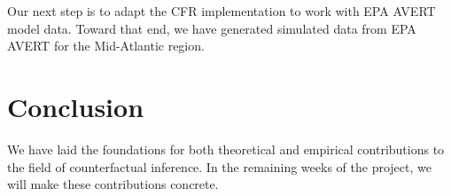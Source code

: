 \documentclass{article}
\begin{document}
Our next step is to adapt the CFR implementation to work with EPA AVERT model data.  Toward that end, we have generated simulated data from EPA AVERT for the Mid-Atlantic region.

\section{Conclusion}
We have laid the foundations for both theoretical and empirical contributions to the field of counterfactual inference.
In the remaining weeks of the project, we will make these contributions concrete.











\end{document}
